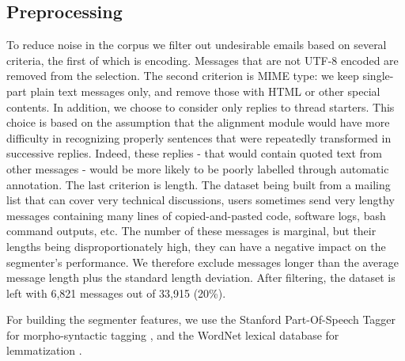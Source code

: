 \subsection{Preprocessing}

To reduce noise in the corpus we filter out undesirable emails based on several criteria, the first of which is encoding. Messages that are not UTF-8 encoded are removed from the selection. The second criterion is MIME type: we keep single-part plain text messages only, and remove those with HTML or other special contents.
%
In addition, we choose to consider only replies to thread starters. This choice is based on the assumption that the alignment module would have more difficulty in recognizing properly sentences that were repeatedly transformed in successive replies. Indeed, these replies - that would contain quoted text from other messages - would be more likely to be poorly labelled through automatic annotation.
%
The last criterion %
 is length. The dataset being built from a mailing list that can cover very technical discussions, users sometimes send very lengthy messages containing many lines of copied-and-pasted code, software logs, bash command outputs, etc. The number of these messages is marginal, but their lengths being disproportionately high, they can have a negative impact on the segmenter's performance. We therefore exclude messages longer than the average message length plus the standard length deviation.
%
After filtering, the dataset is left with 6,821 messages out of 33,915 (20\%).

For building the segmenter features, we use the Stanford %
 Part-Of-Speech Tagger for morpho-syntactic tagging \cite{toutanova2003feature}, and the WordNet lexical database for lemmatization \cite{miller1995wordnet}.

